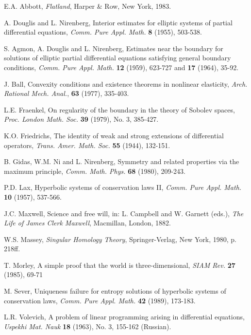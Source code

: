 \begin{list}{}{\setlength{\labelwidth}{3em}\setlength{\leftmargin}{4em}\setlength{\labelsep}{.8em}}
\item[{[Ab]}] E.A. Abbott, \emph{Flatland}, Harper \& Row, New York, 1983.

\item[{[ADN1]}] A. Douglis and L. Nirenberg, Interior estimates for elliptic systems of partial differential equations, \emph{Comm. Pure Appl. Math.} \textbf{8} (1955), 503-538.

\item[{[ADN2]}] S. Agmon, A. Douglis and L. Nirenberg, Estimates near the boundary for solutions of elliptic partial differential equations satisfying general boundary conditions, \emph{Comm. Pure Appl. Math.} \textbf{12} (1959), 623-727 and \textbf{17} (1964), 35-92.

\item[{[Ba]}] J. Ball, Convexity conditions and existence theorems in nonlinear elasticity, \emph{Arch. Rational Mech. Anal.}, \textbf{63} (1977), 335-403.

\item[{[Fra]}] L.E. Fraenkel, On regularity of the boundary in the theory of Sobolev spaces, \emph{Proc. London Math. Soc.} \textbf{39} (1979), No. 3, 385-427.

\item[{[Fri]}] K.O. Friedrichs, The identity of weak and strong extensions of differential operators, \emph{Trans. Amer. Math. Soc.} \textbf{55} (1944), 132-151.

\item[{[GNN]}] B. Gidas, W.M. Ni and L. Nirenberg, Symmetry and related properties via the maximum principle, \emph{Comm. Math. Phys.} \textbf{68} (1980), 209-243.

\item[{[La]}] P.D. Lax, Hyperbolic systems of conservation laws II, \emph{Comm. Pure Appl. Math.} \textbf{10} (1957), 537-566.

\item[{[Max]}] J.C. Maxwell, Science and free will, in: L. Campbell and W. Garnett (eds.), \emph{The Life of James Clerk Maxwell}, Macmillan, London, 1882.

\item[{[Mas]}] W.S. Massey, \emph{Singular Homology Theory}, Springer-Verlag, New York, 1980, p. 218ff.

\item[{[Mo]}] T. Morley, A simple proof that the world is three-dimensional, \emph{SIAM Rev.} \textbf{27} (1985), 69-71

\item[{[Se]}] M. Sever, Uniqueness failure for entropy solutions of hyperbolic systems of conservation laws, \emph{Comm. Pure Appl. Math.} \textbf{42} (1989), 173-183.

\item[{[Vo]}] L.R. Volevich, A problem of linear programming arising in differential equations, \emph{Uspekhi Mat. Nauk} \textbf{18} (1963), No. 3, 155-162 (Russian).
\end{list}
